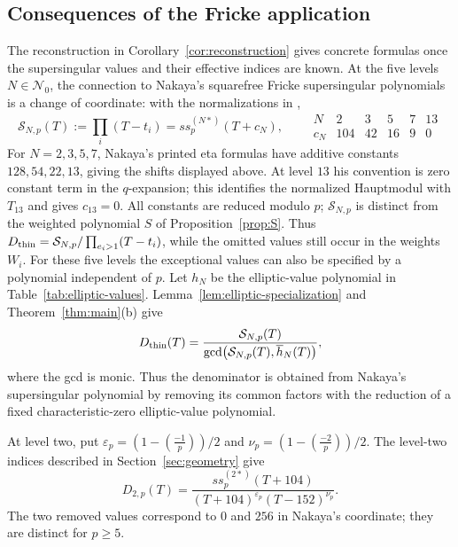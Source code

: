 \documentclass[11pt,a4paper]{article}
\numberwithin{equation}{section}
\theoremstyle{definition}
\theoremstyle{remark}
\begin{document}
\subsection{Consequences of the Fricke application}\label{subsec:consequences}
The reconstruction in Corollary~\ref{cor:reconstruction} gives concrete formulas
once the supersingular values and their effective indices are known.
At the five levels $N\in\mathcal N_0$, the connection to Nakaya's
squarefree Fricke supersingular polynomials is a change of coordinate:
with the normalizations in \citet[\S4]{Nakaya19},
\begin{equation}\label{eq:nakaya-coordinate}
\mathcal S_{N,p}(T):=\prod_i(T-t_i)=ss_p^{(N*)}(T+c_N),\qquad
\begin{array}{c|rrrrr}
N&2&3&5&7&13\\\hline
c_N&104&42&16&9&0
\end{array}
\end{equation}
For $N=2,3,5,7$, Nakaya's printed eta formulas have additive
constants $128,54,22,13$, giving the shifts displayed above. At level
$13$ his convention is zero constant term in the $q$-expansion; this
identifies the normalized Hauptmodul with $T_{13}$ and gives $c_{13}=0$.
All constants are reduced modulo $p$; $\mathcal S_{N,p}$ is distinct from the
weighted polynomial $S$ of Proposition~\ref{prop:S}. Thus
$D_{\rm thin}=\mathcal S_{N,p}/\prod_{e_i>1}(T-t_i)$, while the omitted
values still occur in the weights $W_i$.
For these five levels the exceptional values can also be specified
by a polynomial independent of $p$.
Let $h_N$ be the elliptic-value polynomial in Table~\ref{tab:elliptic-values}.
Lemma~\ref{lem:elliptic-specialization} and Theorem~\ref{thm:main}(b) give
\begin{equation}\label{eq:elliptic-gcd}
D_{\rm thin}(T)=\frac{\mathcal S_{N,p}(T)}
{\gcd\bigl(\mathcal S_{N,p}(T),\overline h_N(T)\bigr)},
\end{equation}
where the gcd is monic. Thus the denominator is obtained from Nakaya's
supersingular polynomial by removing its common factors with the reduction
of a fixed characteristic-zero elliptic-value polynomial.

At level two, put
$\varepsilon_p=(1-\left(\frac{-1}{p}\right))/2$ and
$\nu_p=(1-\left(\frac{-2}{p}\right))/2$.
The level-two indices described in Section~\ref{sec:geometry} give
\begin{equation}\label{eq:leveltwo-denominator}
D_{2,p}(T)=\frac{ss_p^{(2*)}(T+104)}
{(T+104)^{\varepsilon_p}(T-152)^{\nu_p}}.
\end{equation}
The two removed values correspond to $0$ and $256$ in Nakaya's coordinate;
they are distinct for $p\ge5$.
\end{document}
